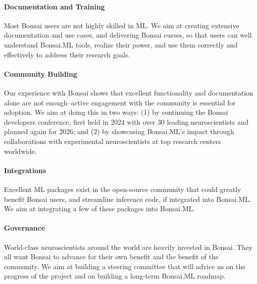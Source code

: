 
\paragraph{Documentation and Training} Most Bonsai users are not highly skilled
in ML. We aim at creating extensive documentation and use cases, and delivering
Bonsai curses, so that users can well understand Bonsai.ML tools, realize their
power, and use them correctly and effectively to address their research goals.

\paragraph{Community Building} Our experience with Bonsai shows that excellent
functionality and documentation alone are not enough--active engagement with the
community is essential for adoption. We aim at doing this in two ways: (1) by
continuing the Bonsai developers conference, first held in 2024 with over 30
leading neuroscientists and planned again for 2026; and (2) by showcasing
Bonsai.ML’s impact through collaborations with experimental neuroscientists at
top research centers worldwide.

\paragraph{Integrations} Excellent ML packages exist in the open-source
community that could greatly benefit Bonsai users, and streamline
inference code, if integrated into Bonsai.ML. We aim at integrating a few of
these packages into Bonsai.ML.

\paragraph{Governance} World-class neuroscientists around the world are heavily
invested in Bonsai. They all want Bonsai to advance for their own benefit and
the benefit of the community. We aim at building a steering committee that will
advice us on the progress of the project and on building a long-term Bonsai.ML
roadmap.
